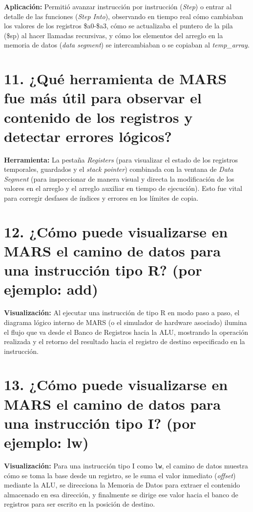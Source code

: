 \documentclass[12pt,a4paper]{article}
\begin{document}
\textbf{Aplicación:} Permitió avanzar instrucción por instrucción (\textit{Step}) o entrar al detalle de las funciones (\textit{Step Into}), observando en tiempo real cómo cambiaban los valores de los registros \$a0-\$a3, cómo se actualizaba el puntero de la pila (\$sp) al hacer llamadas recursivas, y cómo los elementos del arreglo en la memoria de datos (\textit{data segment}) se intercambiaban o se copiaban al \textit{temp\_array}.

\section*{11. ¿Qué herramienta de MARS fue más útil para observar el contenido de los registros y detectar errores lógicos?}

\textbf{Herramienta:} La pestaña \textit{Registers} (para visualizar el estado de los registros temporales, guardados y el \textit{stack pointer}) combinada con la ventana de \textit{Data Segment} (para inspeccionar de manera visual y directa la modificación de los valores en el arreglo y el arreglo auxiliar en tiempo de ejecución). Esto fue vital para corregir desfases de índices y errores en los límites de copia.

\section*{12. ¿Cómo puede visualizarse en MARS el camino de datos para una instrucción tipo R? (por ejemplo: add)}

\textbf{Visualización:} Al ejecutar una instrucción de tipo R en modo paso a paso, el diagrama lógico interno de MARS (o el simulador de hardware asociado) ilumina el flujo que va desde el Banco de Registros hacia la ALU, mostrando la operación realizada y el retorno del resultado hacia el registro de destino especificado en la instrucción.

\section*{13. ¿Cómo puede visualizarse en MARS el camino de datos para una instrucción tipo I? (por ejemplo: lw)}

\textbf{Visualización:} Para una instrucción tipo I como \texttt{lw}, el camino de datos muestra cómo se toma la base desde un registro, se le suma el valor inmediato (\textit{offset}) mediante la ALU, se direcciona la Memoria de Datos para extraer el contenido almacenado en esa dirección, y finalmente se dirige ese valor hacia el banco de registros para ser escrito en la posición de destino.
\end{document}
